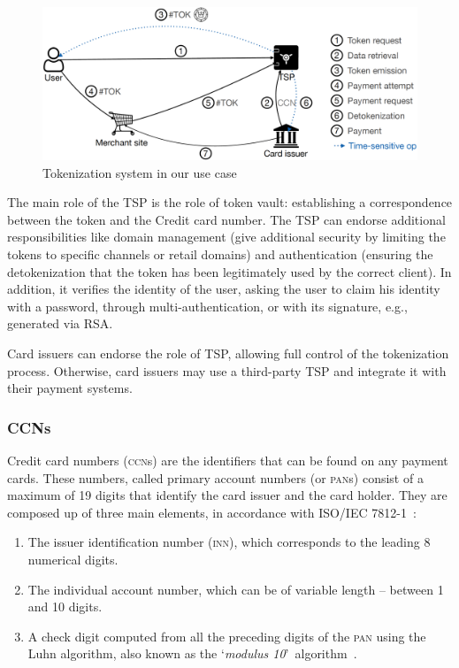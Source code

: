 \documentclass{llncs}
\begin{document}
\begin{figure}
    \centering
    \includegraphics[width=\textwidth]{Tex/Figures/use_case.png}
    \caption{Tokenization system in our use case}
    \label{fig:tokenization-system}
\end{figure}

The main role of the TSP is the role of token vault: establishing a correspondence between the token and the Credit card number. The TSP can endorse additional responsibilities like domain management (give additional security by limiting the tokens to specific channels or retail domains) and authentication (ensuring the detokenization that the token has been legitimately used by the correct client). In addition, it verifies the identity of the user, asking the user to claim his identity with a password, through multi-authentication, or with its signature, e.g., generated via RSA.

Card issuers can endorse the role of TSP, allowing full control of the tokenization process. Otherwise, card issuers may use a third-party TSP and integrate it with their payment systems.

\subsubsection{CCNs}
Credit card numbers (\textsc{ccn}s) are the identifiers that can be found on any payment cards. These numbers, called primary account numbers (or \textsc{pan}s) consist of a maximum of 19 digits that identify the card issuer and the card holder. They are composed up of three main elements, in accordance with ISO/IEC 7812-1~\cite{ISO78121}:
\begin{enumerate}
    \item The issuer identification number (\textsc{inn}), which corresponds to the leading 8 numerical digits. 
    \item The individual account number, which can be of variable length -- between 1 and 10 digits.
    \item A check digit computed from all the preceding digits of the \textsc{pan} using the Luhn algorithm, also known as the \lq\textit{modulus 10}\rq~algorithm~\cite{Luhn1960}.
\end{enumerate}
\end{document}
